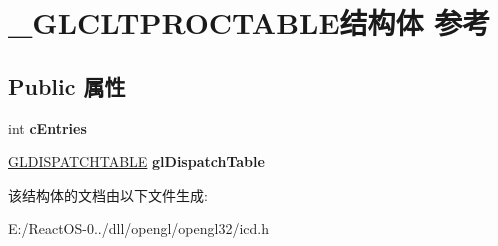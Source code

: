 \hypertarget{struct___g_l_c_l_t_p_r_o_c_t_a_b_l_e}{}\section{\+\_\+\+G\+L\+C\+L\+T\+P\+R\+O\+C\+T\+A\+B\+L\+E结构体 参考}
\label{struct___g_l_c_l_t_p_r_o_c_t_a_b_l_e}
\subsection*{Public 属性}
\begin{DoxyCompactItemize}
\item 
\mbox{\label{struct___g_l_c_l_t_p_r_o_c_t_a_b_l_e_aefde140056228c7f8b2836df2dea46f3}} 
int {\bfseries c\+Entries}
\item 
\mbox{\label{struct___g_l_c_l_t_p_r_o_c_t_a_b_l_e_a5e99ae423a5bebe8f1761f76ea2a52bc}} 
\hyperlink{struct_____g_ldispatch_table_rec}{G\+L\+D\+I\+S\+P\+A\+T\+C\+H\+T\+A\+B\+LE} {\bfseries gl\+Dispatch\+Table}
\end{DoxyCompactItemize}


该结构体的文档由以下文件生成\+:\begin{DoxyCompactItemize}
\item 
E\+:/\+React\+O\+S-\/0../dll/opengl/opengl32/icd.\+h\end{DoxyCompactItemize}
